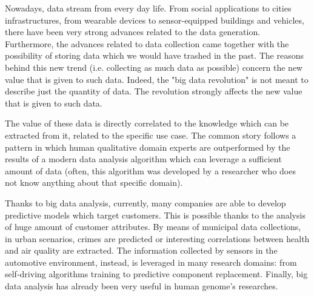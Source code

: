 Nowadays, data stream from every day life. From social applications to cities infrastructures, from wearable devices to sensor-equipped buildings and vehicles, there have been very strong advances related to the data generation. Furthermore, the advances related to data collection came together with the possibility of storing data which we would have trashed in the past. The reasons behind this new trend (i.e. collecting as much data as possible) concern the new value that is given to such data. Indeed, the "big data revolution" is not meant to describe just the quantity of data. The revolution strongly affects the new value that is given to such data.  

%

The value of these data is directly correlated to the knowledge which can be extracted from it, related to the specific use case. The common story follows a pattern in which human qualitative domain experts are outperformed by the results of a modern data analysis algorithm which can leverage a sufficient amount of data (often, this algorithm was developed by a researcher who does not know anything about that specific domain).

Thanks to big data analysis, currently, many companies are able to develop predictive models which target customers. This is possible thanks to the analysis of huge amount of customer attributes. By means of municipal data collections, in urban scenarios, crimes are predicted or interesting correlations between health and air quality are extracted. The information collected by sensors in the automotive environment, instead, is leveraged in many research domains: from self-driving algorithms training to predictive component replacement. Finally, big data analysis has already been very useful in human genome's researches. 


